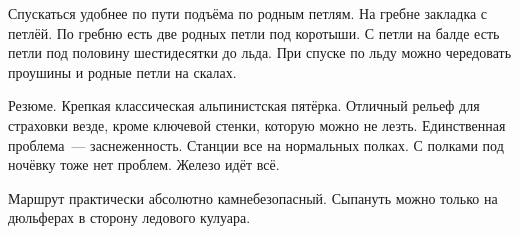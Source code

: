 


Спускаться удобнее по пути подъёма по родным петлям. На гребне закладка с петлёй. По гребню есть две родных петли под коротыши. С петли на
балде есть петли под половину шестидесятки до льда. При спуске по льду можно чередовать проушины и родные петли на скалах.

Резюме. Крепкая классическая альпинистская пятёрка. Отличный рельеф для страховки везде, кроме ключевой стенки, которую можно не лезть.
Единственная проблема~--- заснеженность. Станции все на нормальных полках. С полками под ночёвку тоже нет проблем. Железо идёт всё.

Маршрут практически абсолютно камнебезопасный. Сыпануть можно только на дюльферах в сторону ледового кулуара.
